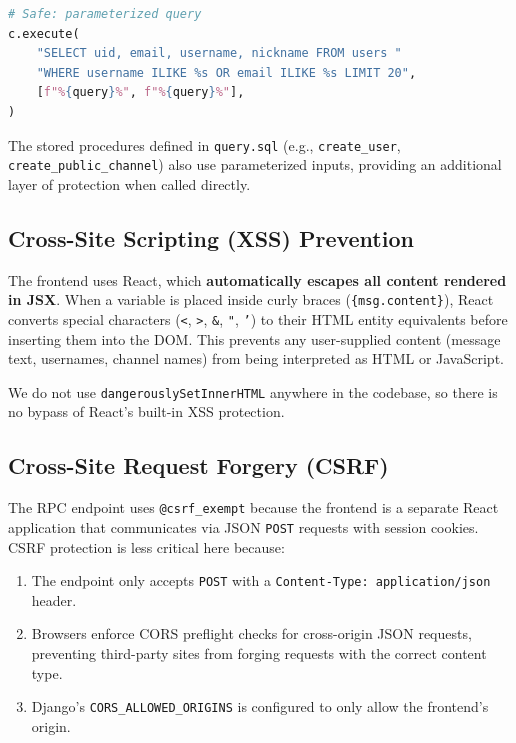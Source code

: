 \documentclass[11pt]{article}
\begin{document}
\begin{lstlisting}[language=Python]
# Safe: parameterized query
c.execute(
    "SELECT uid, email, username, nickname FROM users "
    "WHERE username ILIKE %s OR email ILIKE %s LIMIT 20",
    [f"%{query}%", f"%{query}%"],
)
\end{lstlisting}

The stored procedures defined in \texttt{query.sql} (e.g., \texttt{create\_user}, \texttt{create\_public\_channel}) also use parameterized inputs, providing an additional layer of protection when called directly.

\subsection{Cross-Site Scripting (XSS) Prevention}

The frontend uses React, which \textbf{automatically escapes all content rendered in JSX}. When a variable is placed inside curly braces (\texttt{\{msg.content\}}), React converts special characters (\texttt{<}, \texttt{>}, \texttt{\&}, \texttt{"}, \texttt{'}) to their HTML entity equivalents before inserting them into the DOM. This prevents any user-supplied content (message text, usernames, channel names) from being interpreted as HTML or JavaScript.

We do not use \texttt{dangerouslySetInnerHTML} anywhere in the codebase, so there is no bypass of React's built-in XSS protection.

\subsection{Cross-Site Request Forgery (CSRF)}

The RPC endpoint uses \texttt{@csrf\_exempt} because the frontend is a separate React application that communicates via JSON \texttt{POST} requests with session cookies. CSRF protection is less critical here because:
\begin{enumerate}
    \item The endpoint only accepts \texttt{POST} with a \texttt{Content-Type: application/json} header.
    \item Browsers enforce CORS preflight checks for cross-origin JSON requests, preventing third-party sites from forging requests with the correct content type.
    \item Django's \texttt{CORS\_ALLOWED\_ORIGINS} is configured to only allow the frontend's origin.
\end{enumerate}
\end{document}
